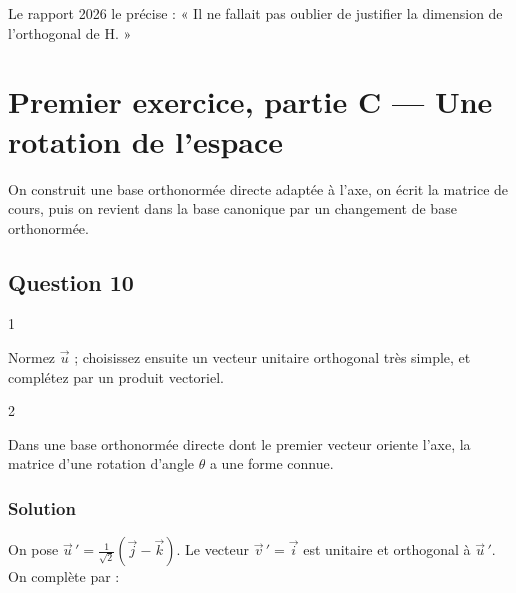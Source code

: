 \documentclass[11pt,a4paper]{article}
\newcommand{\equationajustee}[1]{%
  \sbox{\boiteequation}{$\displaystyle #1$}%
  \ifdim\wd\boiteequation>\linewidth
    \[\resizebox{\linewidth}{!}{\usebox{\boiteequation}}\]%
  \else
    \[#1\]%
  \fi}
\begin{document}
\begin{jury}

Le rapport 2026 le précise : « Il ne fallait pas oublier de justifier la dimension de l'orthogonal de H. »

\end{jury}

\hypertarget{premier-exercice-partie-c-une-rotation-de-lespace}{%
\section{Premier exercice, partie C --- Une rotation de l'espace}\label{premier-exercice-partie-c-une-rotation-de-lespace}}

On construit une base orthonormée directe adaptée à l'axe, on écrit la matrice de cours, puis on revient dans la base canonique par un changement de base orthonormée.

\hypertarget{question-10}{%
\subsection{Question 10}\label{question-10}}

\begin{indication}{1}

Normez \(\vec u\) ; choisissez ensuite un vecteur unitaire orthogonal très simple, et complétez par un produit vectoriel.

\end{indication}

\begin{indication}{2}

Dans une base orthonormée directe dont le premier vecteur oriente l'axe, la matrice d'une rotation d'angle \(\theta\) a une forme connue.

\end{indication}

\hypertarget{solution-10}{%
\subsubsection{Solution}\label{solution-10}}

On pose \(\vec u\,'=\frac1{\sqrt2}(\vec j-\vec k)\). Le vecteur \(\vec v\,'=\vec i\) est unitaire et orthogonal à \(\vec u\,'\). On complète par :

\equationajustee{\begin{aligned}
\vec w\,'&=\vec u\,'\wedge\vec v\,'\\
&=\frac1{\sqrt2}(\vec j\wedge\vec i-\vec k\wedge\vec i)\\
&=-\frac1{\sqrt2}(\vec j+\vec k).
\end{aligned}}
\end{document}

